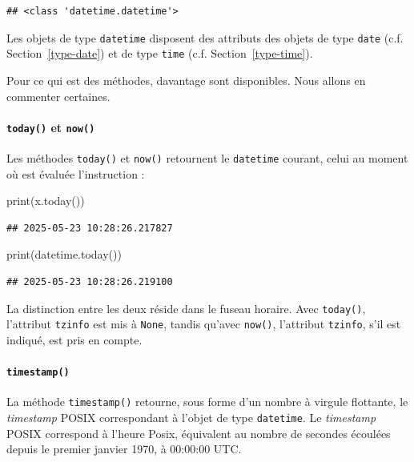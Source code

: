 \documentclass[
  12pt,
]{book}
\newenvironment{Shaded}{\begin{snugshade}}{\end{snugshade}}
\newcommand{\BuiltInTok}[1]{#1}
\newcommand{\NormalTok}[1]{#1}
\numberwithin{equation}{section}
\numberwithin{countremarque}{section}
\begin{document}
\begin{lstlisting}
## <class 'datetime.datetime'>
\end{lstlisting}

Les objets de type \texttt{datetime} disposent des attributs des objets de type \texttt{date} (c.f. Section~\ref{type-date}) et de type \texttt{time} (c.f. Section~\ref{type-time}).

Pour ce qui est des méthodes, davantage sont disponibles. Nous allons en commenter certaines.

\paragraph{\texorpdfstring{\texttt{today()} et \texttt{now()}}{today() et now()}}\label{today-et-now}

Les méthodes \texttt{today()} et \texttt{now()} retournent le \texttt{datetime} courant, celui au moment où est évaluée l'instruction :

\begin{Shaded}
\begin{Highlighting}[]
\BuiltInTok{print}\NormalTok{(x.today())}
\end{Highlighting}
\end{Shaded}

\begin{lstlisting}
## 2025-05-23 10:28:26.217827
\end{lstlisting}

\begin{Shaded}
\begin{Highlighting}[]
\BuiltInTok{print}\NormalTok{(datetime.today())}
\end{Highlighting}
\end{Shaded}

\begin{lstlisting}
## 2025-05-23 10:28:26.219100
\end{lstlisting}

La distinction entre les deux réside dans le fuseau horaire. Avec \texttt{today()}, l'attribut \texttt{tzinfo} est mis à \texttt{None}, tandis qu'avec \texttt{now()}, l'attribut \texttt{tzinfo}, s'il est indiqué, est pris en compte.

\paragraph{\texorpdfstring{\texttt{timestamp()}}{timestamp()}}\label{timestamp}

La méthode \texttt{timestamp()} retourne, sous forme d'un nombre à virgule flottante, le \emph{timestamp} POSIX correspondant à l'objet de type \texttt{datetime}. Le \emph{timestamp} POSIX correspond à l'heure Posix, équivalent au nombre de secondes écoulées depuis le premier janvier 1970, à 00:00:00 UTC.
\end{document}
